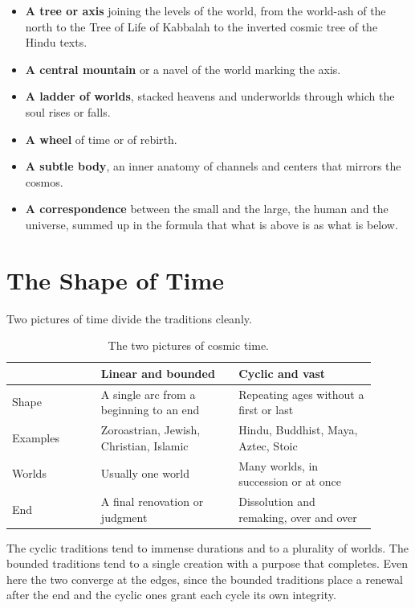 \begin{itemize}
  \item \textbf{A tree or axis} joining the levels of the world, from the world-ash of the north to the Tree
  of Life of Kabbalah to the inverted cosmic tree of the Hindu texts.
  \item \textbf{A central mountain} or a navel of the world marking the axis.
  \item \textbf{A ladder of worlds}, stacked heavens and underworlds through which the soul rises or falls.
  \item \textbf{A wheel} of time or of rebirth.
  \item \textbf{A subtle body}, an inner anatomy of channels and centers that mirrors the cosmos.
  \item \textbf{A correspondence} between the small and the large, the human and the universe, summed up in
  the formula that what is above is as what is below.
\end{itemize}

\section{The Shape of Time}

Two pictures of time divide the traditions cleanly.

\begin{longtable}{L{0.22\linewidth} L{0.34\linewidth} L{0.34\linewidth}}
\caption{The two pictures of cosmic time.}\\
\toprule
 & \textbf{Linear and bounded} & \textbf{Cyclic and vast} \\
\midrule
Shape & A single arc from a beginning to an end & Repeating ages without a first or last \\
Examples & Zoroastrian, Jewish, Christian, Islamic & Hindu, Buddhist, Maya, Aztec, Stoic \\
Worlds & Usually one world & Many worlds, in succession or at once \\
End & A final renovation or judgment & Dissolution and remaking, over and over \\
\bottomrule
\end{longtable}

The cyclic traditions tend to immense durations and to a plurality of worlds. The bounded traditions tend to
a single creation with a purpose that completes. Even here the two converge at the edges, since the bounded
traditions place a renewal after the end and the cyclic ones grant each cycle its own integrity.

